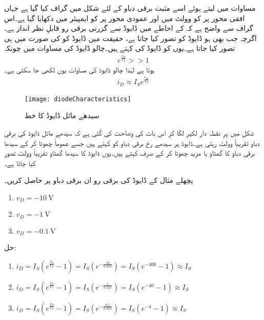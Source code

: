 مساوات   میں  لیتے ہوئے اسے مثبت برقی دباو کے لئے  شکل  میں گراف کیا گیا ہے جہاں افقی محور پر  کو وولٹ میں اور عمودی محور پر  کو ایمپیئر میں دکھایا گیا ہے۔اس گراف سے واضح ہے کہ   کے احاطے میں ڈایوڈ سے گزرتی برقی رو قابلِ نظر انداز ہے۔اگرچہ جب بھی   ہو ڈایوڈ کو  تصور کیا جاتا ہے، حقیقت میں ڈایوڈ کو کی صورت میں ہی  تصور کیا جاتا ہے۔یوں  کو ڈایوڈ  کی   کہتے ہیں۔چالو ڈایوڈ کی مساوات میں چونکہ 
\begin{align*}
e^{\frac{v_D}{V_T}}>>1
\end{align*}
ہوتا ہے لہٰذا چالو ڈایوڈ کی مساوات یوں لکھی جا سکتی ہے۔
\begin{align} \label{مساوات_چالو_ڈایوڈ}
i_D \approx I_S e^{\frac{v_D}{V_T}}
\end{align}
%
\begin{figure}
\centering
\texttt{[image: diodeCharacteristics]}
\caption{سیدھے مائل ڈایوڈ کا خط}
\label{شکل_ڈایوڈ_کا_خط}
\end{figure} 
شکل  میں  پر نقطہ دار لکیر لگا کر اس بات کی وضاحت کی گئی ہے کہ سیدھے مائل ڈایوڈ کی برقی دباو   تقریباً  وولٹ رہتی ہے۔ڈایوڈ پر سیدھے رخ برقی دباو کو   کہتے ہیں جسے عموماً چھوٹا کر کے سیدھا برقی دباو کا گھٹاو یا مزید چھوٹا کر کے صرف  کہتے ہیں۔یوں ڈایوڈ کا سیدھا گھٹاو تقریباً وولٹ تصور کیا جاتا ہے۔

پچھلے مثال کے  ڈایوڈ کی برقی رو   ان برقی دباو پر حاصل کریں۔
\begin{enumerate}
\item
$v_D=\SI{-10}{\volt}$
\item
$v_D=\SI{-1}{\volt}$
\item
$v_D=\SI{-0.1}{\volt}$
\end{enumerate}

حل:
\begin{enumerate}
\item
$
i_D=I_S \left (e^{\frac{v_D}{V_T}}-1 \right )=I_S \left (e^{-\frac{10}{0.025}} \right )=I_S \left(e^{-400}-1 \right ) \approx I_S
$
\item
$
i_D=I_S \left (e^{\frac{v_D}{V_T}}-1 \right )=I_S \left (e^{-\frac{1}{0.025}} \right ) =I_S \left (e^{-40}-1 \right ) \approx I_S
$
\item
$
i_D=I_S \left (e^{\frac{v_D}{V_T}}-1 \right )=I_S \left (e^{-\frac{0.1}{0.025}} \right ) =I_S \left (e^{-4}-1 \right ) \approx I_S
$
\end{enumerate}



